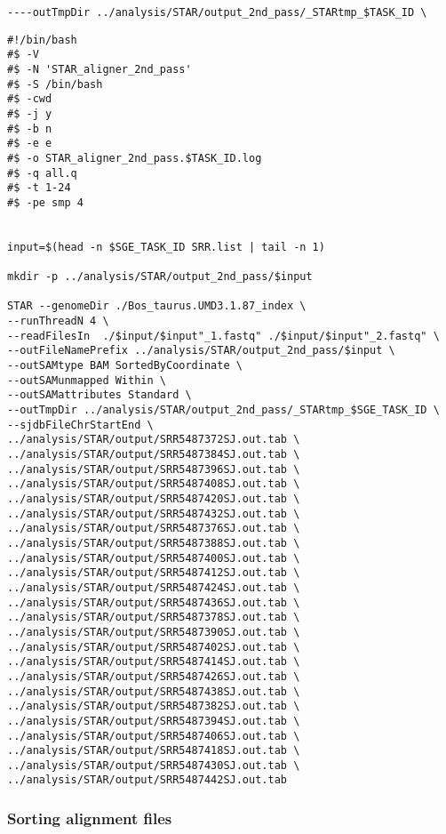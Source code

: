 \begin{verbatim}
----outTmpDir ../analysis/STAR/output_2nd_pass/_STARtmp_$TASK_ID \
\end{verbatim}

\begin{verbatim}
#!/bin/bash
#$ -V
#$ -N 'STAR_aligner_2nd_pass'
#$ -S /bin/bash
#$ -cwd
#$ -j y
#$ -b n
#$ -e e
#$ -o STAR_aligner_2nd_pass.$TASK_ID.log
#$ -q all.q
#$ -t 1-24
#$ -pe smp 4


input=$(head -n $SGE_TASK_ID SRR.list | tail -n 1)

mkdir -p ../analysis/STAR/output_2nd_pass/$input

STAR --genomeDir ./Bos_taurus.UMD3.1.87_index \
--runThreadN 4 \
--readFilesIn  ./$input/$input"_1.fastq" ./$input/$input"_2.fastq" \
--outFileNamePrefix ../analysis/STAR/output_2nd_pass/$input \
--outSAMtype BAM SortedByCoordinate \
--outSAMunmapped Within \
--outSAMattributes Standard \
--outTmpDir ../analysis/STAR/output_2nd_pass/_STARtmp_$SGE_TASK_ID \
--sjdbFileChrStartEnd \
../analysis/STAR/output/SRR5487372SJ.out.tab \
../analysis/STAR/output/SRR5487384SJ.out.tab \
../analysis/STAR/output/SRR5487396SJ.out.tab \
../analysis/STAR/output/SRR5487408SJ.out.tab \
../analysis/STAR/output/SRR5487420SJ.out.tab \
../analysis/STAR/output/SRR5487432SJ.out.tab \
../analysis/STAR/output/SRR5487376SJ.out.tab \
../analysis/STAR/output/SRR5487388SJ.out.tab \
../analysis/STAR/output/SRR5487400SJ.out.tab \
../analysis/STAR/output/SRR5487412SJ.out.tab \
../analysis/STAR/output/SRR5487424SJ.out.tab \
../analysis/STAR/output/SRR5487436SJ.out.tab \
../analysis/STAR/output/SRR5487378SJ.out.tab \
../analysis/STAR/output/SRR5487390SJ.out.tab \
../analysis/STAR/output/SRR5487402SJ.out.tab \
../analysis/STAR/output/SRR5487414SJ.out.tab \
../analysis/STAR/output/SRR5487426SJ.out.tab \
../analysis/STAR/output/SRR5487438SJ.out.tab \
../analysis/STAR/output/SRR5487382SJ.out.tab \
../analysis/STAR/output/SRR5487394SJ.out.tab \
../analysis/STAR/output/SRR5487406SJ.out.tab \
../analysis/STAR/output/SRR5487418SJ.out.tab \
../analysis/STAR/output/SRR5487430SJ.out.tab \
../analysis/STAR/output/SRR5487442SJ.out.tab

\end{verbatim}



\subsubsection{Sorting alignment files}



